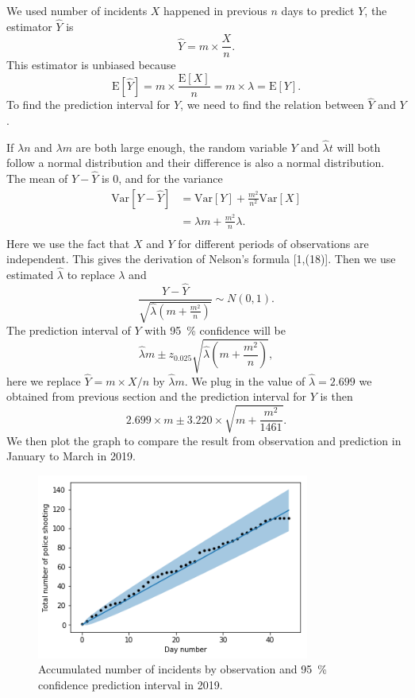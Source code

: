 \documentclass[11pt,a4paper,english]{article}
\begin{document}
We used number of incidents $X$ happened in previous $n$ days to predict $Y$, the estimator $\hat{Y}$ is 
\begin{equation*}
\hat{Y} = m \times \frac{X}{n}.
\end{equation*}
This estimator is unbiased because 
\begin{equation*}
	\text{E}[\hat{Y}] = m \times \frac{\text{E}[X]}{n} = m \times \lambda = \text{E}[Y].
\end{equation*}
To find the prediction interval for $Y$, we need to find the relation between $\hat{Y}$ and $Y$.

If $\lambda n$ and $\lambda m$ are both large enough, the random variable $Y$ and $\hat{\lambda}t$ will both follow a normal distribution and their difference is also a normal distribution.
The mean of $Y-\hat{Y}$ is $0$, and for the variance
\begin{align*}
	\text{Var}[Y-\hat{Y}] &= \text{Var}[Y]+\frac{m^{2}}{n^{2}}\text{Var}[X]\\
	&= \lambda m+\frac{m^{2}}{n}\lambda.\\
\end{align*}
Here we use the fact that $X$ and $Y$ for different periods of observations are independent.
This gives the derivation of Nelson's formula [1,(18)].
Then we use estimated $\hat{\lambda}$ to replace $\lambda$ and 
\begin{equation*}
	\frac{Y-\hat{Y}}{\sqrt{\hat{\lambda}\left(m+\frac{m^{2}}{n}\right)}} \sim N(0,1).
\end{equation*}
The prediction interval of $Y$ with \SI{95}{\percent} confidence will be 
\begin{equation*}
	\hat{\lambda}m \pm z_{0.025}\sqrt{\hat{\lambda}\left(m+\frac{m^{2}}{n}\right)},
\end{equation*}
here we replace $\hat{Y} = m \times X/n$ by $\hat{\lambda}m$. We plug in the value of $\hat{\lambda} = 2.699$ we obtained from previous section and the prediction interval for $Y$ is then 
\begin{equation*}
	2.699 \times m \pm 3.220 \times \sqrt{m+\frac{m^{2}}{1461}}.
\end{equation*} 
We then plot the graph to compare the result from observation and prediction in January to March in 2019.
\begin{figure}[htbp]
	\centering
	\includegraphics[width=0.8\textwidth]{predict}
	\caption{Accumulated number of incidents by observation and \SI{95}{\percent} confidence prediction interval in 2019.}
	\label{fig:predict}
\end{figure}
\end{document}
